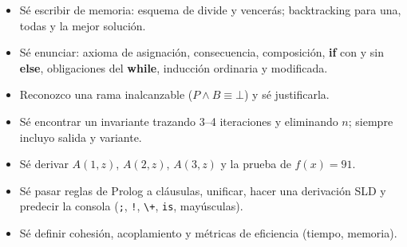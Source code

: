 \vspace{1em}
\begin{consejo}
\begin{itemize}[leftmargin=*]
\item Sé escribir de memoria: esquema de divide y vencerás; backtracking para una, todas y la mejor solución.
\item Sé enunciar: axioma de asignación, consecuencia, composición, \textbf{if} con y sin \textbf{else}, obligaciones del \textbf{while}, inducción ordinaria y modificada.
\item Reconozco una rama inalcanzable ($P\land B\equiv\bot$) y sé justificarla.
\item Sé encontrar un invariante trazando 3--4 iteraciones y eliminando $n$; siempre incluyo salida y variante.
\item Sé derivar $A(1,z)$, $A(2,z)$, $A(3,z)$ y la prueba de $f(x)=91$.
\item Sé pasar reglas de Prolog a cláusulas, unificar, hacer una derivación SLD y predecir la consola (\texttt{;}, \texttt{!}, \texttt{\textbackslash+}, \texttt{is}, mayúsculas).
\item Sé definir cohesión, acoplamiento y métricas de eficiencia (tiempo, memoria).
\end{itemize}
\end{consejo}
